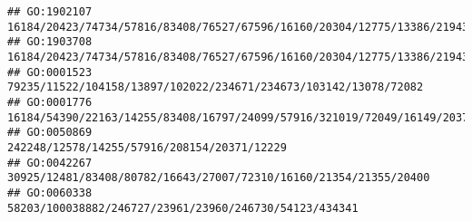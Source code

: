 \documentclass[
]{article}
\begin{document}
\begin{verbatim}
## GO:1902107                                                                                                                                                                                                                                                                                                  16184/20423/74734/57816/83408/76527/67596/16160/20304/12775/13386/21943/75766/14998/14960/16149/20371/16186
## GO:1903708                                                                                                                                                                                                                                                                                                  16184/20423/74734/57816/83408/76527/67596/16160/20304/12775/13386/21943/75766/14998/14960/16149/20371/16186
## GO:0001523                                                                                                                                                                                                                                                                                                                                             79235/11522/104158/13897/102022/234671/234673/103142/13078/72082
## GO:0001776                                                                                                                                                                                                                                                                                                                        16184/54390/22163/14255/83408/16797/24099/57916/321019/72049/16149/20371/213439/12229
## GO:0050869                                                                                                                                                                                                                                                                                                                                                                  242248/12578/14255/57916/208154/20371/12229
## GO:0042267                                                                                                                                                                                                                                                                                                                                            30925/12481/83408/80782/16643/27007/72310/16160/21354/21355/20400
## GO:0060338                                                                                                                                                                                                                                                                                                                                                       58203/100038882/246727/23961/23960/246730/54123/434341

\end{verbatim}
\end{document}
